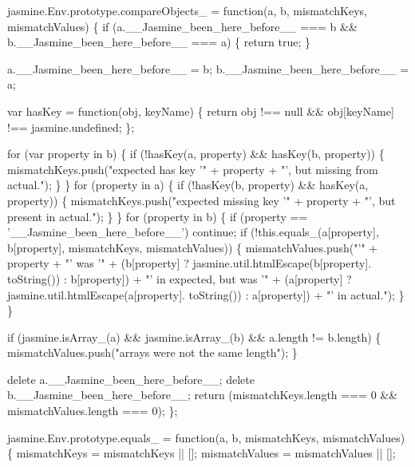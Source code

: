 \begin{DoxyCodeInclude}
jasmine.Env.prototype.compareObjects\_ = \textcolor{keyword}{function}(a, b, mismatchKeys, mismatchValues) \{
  \textcolor{keywordflow}{if} (a.\_\_Jasmine\_been\_here\_before\_\_ === b && b.\_\_Jasmine\_been\_here\_before\_\_ === a) \{
    \textcolor{keywordflow}{return} \textcolor{keyword}{true};
  \}

  a.\_\_Jasmine\_been\_here\_before\_\_ = b;
  b.\_\_Jasmine\_been\_here\_before\_\_ = a;

  var hasKey = \textcolor{keyword}{function}(obj, keyName) \{
    \textcolor{keywordflow}{return} obj !== null && obj[keyName] !== jasmine.undefined;
  \};

  \textcolor{keywordflow}{for} (var property in b) \{
    \textcolor{keywordflow}{if} (!hasKey(a, property) && hasKey(b, property)) \{
      mismatchKeys.push(\textcolor{stringliteral}{"expected has key '"} + property + \textcolor{stringliteral}{"', but missing from actual."});
    \}
  \}
  \textcolor{keywordflow}{for} (property in a) \{
    \textcolor{keywordflow}{if} (!hasKey(b, property) && hasKey(a, property)) \{
      mismatchKeys.push(\textcolor{stringliteral}{"expected missing key '"} + property + \textcolor{stringliteral}{"', but present in actual."});
    \}
  \}
  \textcolor{keywordflow}{for} (property in b) \{
    \textcolor{keywordflow}{if} (property == \textcolor{stringliteral}{'\_\_Jasmine\_been\_here\_before\_\_'}) \textcolor{keywordflow}{continue};
    \textcolor{keywordflow}{if} (!this.equals\_(a[property], b[property], mismatchKeys, mismatchValues)) \{
      mismatchValues.push(\textcolor{stringliteral}{"'"} + property + \textcolor{stringliteral}{"' was '"} + (b[property] ? jasmine.util.htmlEscape(b[property].
      toString()) : b[property]) + \textcolor{stringliteral}{"' in expected, but was '"} + (a[property] ? jasmine.util.htmlEscape(a[property].
      toString()) : a[property]) + \textcolor{stringliteral}{"' in actual."});
    \}
  \}

  \textcolor{keywordflow}{if} (jasmine.isArray\_(a) && jasmine.isArray\_(b) && a.length != b.length) \{
    mismatchValues.push(\textcolor{stringliteral}{"arrays were not the same length"});
  \}

  \textcolor{keyword}{delete} a.\_\_Jasmine\_been\_here\_before\_\_;
  \textcolor{keyword}{delete} b.\_\_Jasmine\_been\_here\_before\_\_;
  \textcolor{keywordflow}{return} (mismatchKeys.length === 0 && mismatchValues.length === 0);
\};

jasmine.Env.prototype.equals\_ = \textcolor{keyword}{function}(a, b, mismatchKeys, mismatchValues) \{
  mismatchKeys = mismatchKeys || [];
  mismatchValues = mismatchValues || [];


\end{DoxyCodeInclude}
